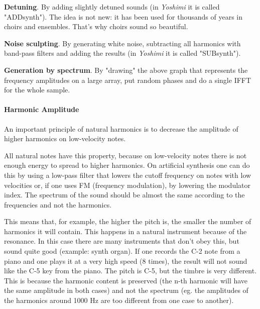   \begin{enumber}
      \item \textbf{Detuning}.
      By adding slightly detuned sounds (in \textsl{Yoshimi}
      it is called "ADDsynth"). The idea is not new: it has been used
      for thousands of years in choirs and ensembles. That's why choirs
      sound so beautiful.
      \item \textbf{Noise sculpting}.
      By generating white noise, subtracting all harmonics with band-pass
      filters and adding the results (in \textsl{Yoshimi}
      it is called "SUBsynth").
      \item \textbf{Generation by spectrum}.
      By "drawing" the above graph that represents the frequency
      amplitudes on a large array, put random phases and do a single
      IFFT for the whole sample.
   \end{enumber}

\paragraph{Harmonic Amplitude}
\label{paragraph:concepts_basics_harmonic_amplitude}

   An important principle of natural harmonics is to decrease the amplitude
   of higher harmonics on low-velocity notes.

   All natural notes have this property, because on low-velocity notes there
   is not enough energy to spread to higher harmonics. On artificial
   synthesis one can do this by using a low-pass filter that lowers the
   cutoff frequency on notes with low velocities or, if one uses FM
   (frequency modulation), by lowering the modulator index. 
   The spectrum of the sound should be almost the same according to
   the frequencies and not the harmonics.

   This means that, for example, the higher the pitch is, the smaller the
   number of harmonics it will contain. This happens in a natural instrument
   because of the resonance. 
   In this case there are many instruments that don't obey this, but sound
   quite good (example: synth organ). 
   If one records the C-2 note from a piano and one plays it at a very high
   speed (8 times), the result will not sound like the C-5 key from the
   piano. The pitch is C-5, but the timbre is very different. This is because
   the harmonic content is preserved (the n-th harmonic will have the
   same amplitude in both cases) and not the spectrum (eg. the
   amplitudes of the harmonics around 1000 Hz are too different from
   one case to another). 

